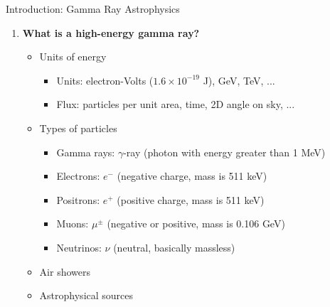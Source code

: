 \documentclass{beamer}
\begin{document}
\begin{frame}{Introduction: Gamma Ray Astrophysics}
\begin{enumerate}
\item \textbf{What is a high-energy gamma ray?}
\begin{itemize}
\item Units of energy
\begin{itemize}
\item Units: electron-Volts ($1.6 \times 10^{-19}$ J), GeV, TeV, ...
\item Flux: particles per unit area, time, 2D angle on sky, ...
\end{itemize}
\item Types of particles
\begin{itemize}
\item Gamma rays: $\gamma$-ray (photon with energy greater than 1 MeV)
\item Electrons: $e^{-}$ (negative charge, mass is 511 keV)
\item Positrons: $e^{+}$ (positive charge, mass is 511 keV)
\item Muons: $\mu^{\pm}$ (negative or positive, mass is 0.106 GeV)
\item Neutrinos: $\nu$ (neutral, basically massless)
\end{itemize}
\item Air showers
\item Astrophysical sources
\end{itemize}
\end{enumerate}
\end{frame}
\end{document}
